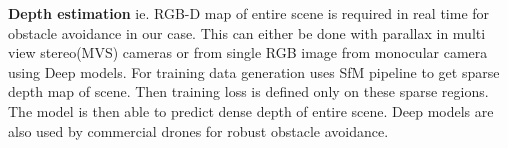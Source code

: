 \textbf{Depth estimation} ie. RGB-D map of entire scene is required in real time for obstacle avoidance in our case. This can either be done with parallax in multi view stereo(MVS) cameras or from single RGB image from monocular camera using Deep models. For training data generation \cite{DBLP:journals/corr/abs-1904-11111} uses SfM pipeline to get sparse depth map of scene. Then training loss is defined only on these sparse regions. The model is then able to predict dense depth of entire scene. Deep models are also used by commercial drones\cite{Skydio2T67:online} for robust obstacle avoidance.